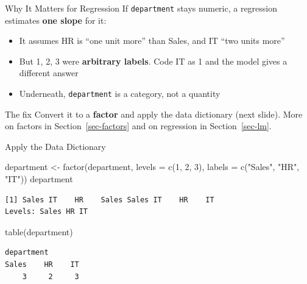 \documentclass[
  ignorenonframetext,
  aspectratio=169,
]{beamer}
\newenvironment{Shaded}{\begin{snugshade}}{\end{snugshade}}
\newcommand{\AttributeTok}[1]{\textcolor[rgb]{0.40,0.45,0.13}{#1}}
\newcommand{\DecValTok}[1]{\textcolor[rgb]{0.68,0.00,0.00}{#1}}
\newcommand{\FunctionTok}[1]{\textcolor[rgb]{0.28,0.35,0.67}{#1}}
\newcommand{\NormalTok}[1]{\textcolor[rgb]{0.00,0.23,0.31}{#1}}
\newcommand{\OtherTok}[1]{\textcolor[rgb]{0.00,0.23,0.31}{#1}}
\newcommand{\StringTok}[1]{\textcolor[rgb]{0.13,0.47,0.30}{#1}}
\providecommand{\tightlist}{%
  \setlength{\itemsep}{0pt}\setlength{\parskip}{0pt}}\usepackage{longtable,booktabs,array}
\begin{document}
\begin{frame}[fragile]{Why It Matters for Regression}
\protect\hypertarget{why-it-matters-for-regression}{}
If \texttt{department} stays numeric, a regression estimates \textbf{one
slope} for it:

\begin{itemize}
\tightlist
\item
  It assumes HR is ``one unit more'' than Sales, and IT ``two units
  more''
\item
  But 1, 2, 3 were \textbf{arbitrary labels}. Code IT as 1 and the model
  gives a different answer
\item
  Underneath, \texttt{department} is a category, not a quantity
\end{itemize}

\begin{block}{The fix}
\protect\hypertarget{the-fix}{}
Convert it to a \textbf{factor} and apply the data dictionary (next
slide). More on factors in Section~\ref{sec-factors} and on regression
in Section~\ref{sec-lm}.
\end{block}
\end{frame}

\begin{frame}[fragile]{Apply the Data Dictionary}
\protect\hypertarget{apply-the-data-dictionary}{}
\begin{Shaded}
\begin{Highlighting}[]
\NormalTok{department }\OtherTok{\textless{}{-}} \FunctionTok{factor}\NormalTok{(department,}
                     \AttributeTok{levels =} \FunctionTok{c}\NormalTok{(}\DecValTok{1}\NormalTok{, }\DecValTok{2}\NormalTok{, }\DecValTok{3}\NormalTok{),}
                     \AttributeTok{labels =} \FunctionTok{c}\NormalTok{(}\StringTok{"Sales"}\NormalTok{, }\StringTok{"HR"}\NormalTok{, }\StringTok{"IT"}\NormalTok{))}
\NormalTok{department}
\end{Highlighting}
\end{Shaded}

\begin{verbatim}
[1] Sales IT    HR    Sales Sales IT    HR    IT   
Levels: Sales HR IT
\end{verbatim}

\begin{Shaded}
\begin{Highlighting}[]
\FunctionTok{table}\NormalTok{(department)}
\end{Highlighting}
\end{Shaded}

\begin{verbatim}
department
Sales    HR    IT 
    3     2     3 
\end{verbatim}
\end{frame}
\end{document}
